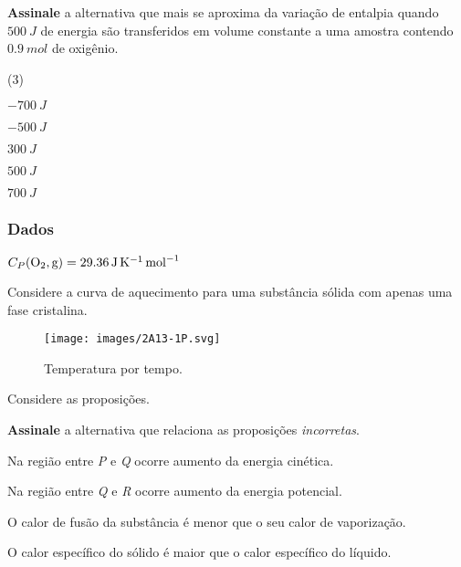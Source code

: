 \documentclass[braun, twocolumn]{braun}
\begin{document}
\begin{problem}
[2A12]\textbf{Assinale} a alternativa que mais se aproxima da variação de
entalpia quando \(\qty{500}{J}\) de energia são transferidos em volume
constante a uma amostra contendo \(\qty{0,9}{mol}\) de oxigênio.


\begin{choices}
(3)
\item \(\qty{-700}{J}\)

\item \(\qty{-500}{J}\)

\item \(\qty{300}{J}\)

\item \(\qty{500}{J}\)

\item \(\qty{700}{J}\)

\end{choices}
\subsubsection*{Dados}


\begin{datalist}

\item $C_P(\ce{O2, {g}}) = \qty{29,36}{J.K^{-1}.mol^{-1}}$
\end{datalist}

\end{problem}



\begin{problem}
[2A13]Considere a curva de aquecimento para uma substância sólida com apenas
uma fase cristalina.

\begin{figure}
\centering
\texttt{[image: images/2A13-1P.svg]}
\caption{Temperatura por tempo.}
\end{figure}

Considere as proposições.

\textbf{Assinale} a alternativa que relaciona as proposições
\emph{incorretas}.


\begin{choices}

\item Na região entre \emph{P} e \emph{Q} ocorre aumento da energia cinética.

\item Na região entre \emph{Q} e \emph{R} ocorre aumento da energia potencial.

\item O calor de fusão da substância é menor que o seu calor de vaporização.

\item O calor específico do sólido é maior que o calor específico do líquido.

\end{choices}

\end{problem}
\end{document}
